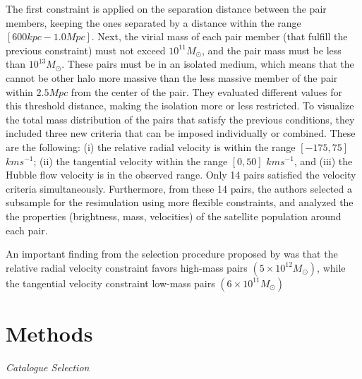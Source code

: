\documentclass[fleqn,usenatbib]{mnras}
\begin{document}
The first constraint is applied on the separation distance between the pair members, keeping the ones separated by a distance within the range $[600kpc-1.0Mpc]$. Next, the virial mass of each pair member (that fulfill the previous constraint) must not exceed $10^{11} M_\odot$, and the pair mass must be less than $10^{13} M_\odot$. These pairs must be in an isolated medium, which means that the cannot be other halo more massive than the less massive member of the pair within $2.5Mpc$ from the center of the pair. They evaluated different values for this threshold distance, making the isolation more or less restricted. To visualize the total mass distribution of the pairs that satisfy the previous conditions, they included three new criteria that can be imposed individually or combined. These are the following: (i) the relative radial velocity is within the range $[-175,75]$ $kms^{-1}$; (ii) the tangential velocity within the range $[0,50]$ $kms^{-1}$, and (iii) the Hubble flow velocity is in the observed range. Only 14 pairs satisfied the velocity criteria simultaneously. Furthermore, from these 14 pairs, the authors selected a subsample for the resimulation using more flexible constraints, and analyzed the the properties (brightness, mass, velocities) of the satellite population around each pair.

An important finding from the selection procedure proposed by \cite{fattahi2016apostle} was that the relative radial velocity constraint favors high-mass pairs $(5\times 10^{12} M_\odot)$, while the tangential velocity constraint low-mass pairs $(6\times 10^{11} M_\odot)$










\section{Methods}
\textit{Catalogue Selection}

 




\end{document}
